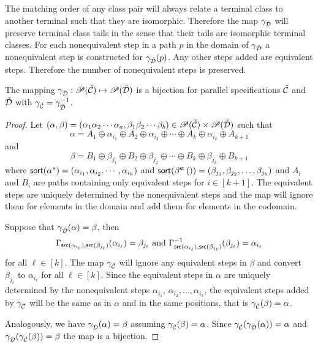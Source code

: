 The matching order of any class pair will always relate a terminal class to another terminal such that they are isomorphic. Therefore the map $\gamma_{\check{\mathcal{D}}}$ will preserve terminal class tails in the sense that their tails are isomorphic terminal classes. For each nonequivalent step in a path $p$ in the domain of $\gamma_{\check{\mathcal{D}}}$ a nonequivalent step is constructed for $\gamma_{\check{\mathcal{D}}}(p)$. Any other steps added are equivalent steps. Therefore the number of nonequivalent steps is preserved.

\begin{proposition}
The mapping $\gamma_{\check{\mathcal{D}}}: \mathscr{P}(\check{\mathcal{C}}) \mapsto \mathscr{P}(\check{\mathcal{D}})$ is a bijection for parallel specifications $\check{\mathcal{C}}$ and $\check{\mathcal{D}}$ with $\gamma_{\check{\mathcal{C}}} = \gamma_{\check{\mathcal{D}}}^{-1}$.
\end{proposition}
\begin{proof}
Let $(\alpha,\beta) = (\alpha_1\alpha_2\dotsm\alpha_a,\beta_1\beta_2\dotsm\beta_b)\in \mathscr{P}(\check{\mathcal{C}}) \times \mathscr{P}(\check{\mathcal{D}})$ such that
\[
    \alpha = A_1 \oplus \alpha_{i_1} \oplus A_2 \oplus \alpha_{i_2} \oplus \dotsm \oplus A_k \oplus \alpha_{i_k} \oplus A_{k+1}
\]
and
\[
    \beta = B_1 \oplus \beta_{j_1} \oplus B_2 \oplus \beta_{j_2} \oplus \dotsm \oplus B_k \oplus \beta_{j_k} \oplus B_{k+1}
\]
where $\textsf{sort}(\alpha^\ast) = (\alpha_{i_1},\alpha_{i_2},\dotsm,\alpha_{i_k})$ and $\textsf{sort}(\beta^\textsf{st}\left()\right) = (\beta_{j_1},\beta_{j_2},\dotsc,\beta_{j_k})$ and $A_i$ and $B_i$ are paths containing only equivalent steps for $i \in [k+1]$. The equivalent steps are uniquely determined by the nonequivalent steps and the map will ignore them for elements in the domain and add them for elements in the codomain.

Suppose that $\gamma_{\check{\mathcal{D}}}(\alpha) = \beta$, then
\[
    \Gamma_{\textsf{src}(\alpha_{i_\ell}),\textsf{src}(\beta_{j_\ell})}(\alpha_{i_\ell}) = \beta_{j_\ell} \text{ and }
    \Gamma_{\textsf{src}(\alpha_{i_\ell}),\textsf{src}(\beta_{j_\ell})}^{-1}(\beta_{j_\ell}) = \alpha_{i_\ell}
\]
for all $\ell \in [k]$. The map $\gamma_{\check{\mathcal{C}}}$ will ignore any equivalent steps in $\beta$ and convert $\beta_{j_\ell}$ to $\alpha_{i_\ell}$ for all $\ell \in [k]$. Since the equivalent steps in $\alpha$ are uniquely determined by the nonequivalent steps $\alpha_{i_1}$, $\alpha_{i_2}, \dotsc, \alpha_{i_k}$, the equivalent steps added by $\gamma_{\check{\mathcal{C}}}$ will be the same as in $\alpha$ and in the same positions, that is $\gamma_{\check{\mathcal{C}}}(\beta) = \alpha$.

Analogously, we have $\gamma_{\check{\mathcal{D}}}(\alpha) = \beta$ assuming $\gamma_{\check{\mathcal{C}}}(\beta) = \alpha$. Since $\gamma_{\check{\mathcal{C}}}(\gamma_{\check{\mathcal{D}}}(\alpha)) = \alpha$ and $\gamma_{\check{\mathcal{D}}}(\gamma_{\check{\mathcal{C}}}(\beta)) = \beta$ the map is a bijection.
\end{proof}

